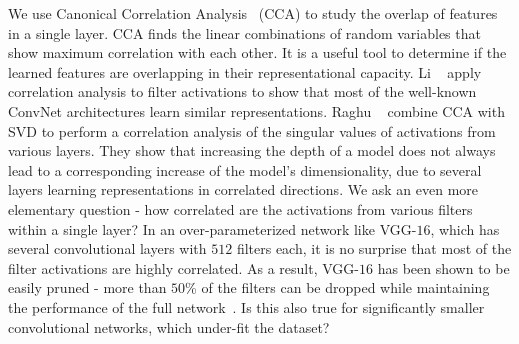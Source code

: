 We use Canonical Correlation Analysis~\cite{hotelling1936relations} (CCA) to study the overlap of features in a single layer.
CCA finds the linear combinations of random variables that show maximum correlation with each other.
It is a useful tool to determine if the learned features are overlapping in their representational capacity. 
Li \etal ~\cite{Li2015ConvergentLD} apply correlation analysis to filter activations to show that most of the well-known ConvNet architectures learn similar representations.
Raghu \etal ~\cite{Raghu2017SVCCASV} combine CCA with SVD to perform a correlation analysis of the singular values of activations from various layers.
They show that increasing the depth of a model does not always lead to a corresponding increase of the model's dimensionality, due to several layers learning representations in correlated directions.
We ask an even more elementary question - how correlated are the activations from various filters within a single layer?
In an over-parameterized network like VGG-$16$, which has several convolutional layers with $512$ filters each, it is no surprise that most of the filter activations are highly correlated.
As a result, VGG-$16$ has been shown to be easily pruned - more than $50$\% of the filters can be dropped while maintaining the performance of the full network~\cite{Molchanov2016PruningCN, Li2015ConvergentLD}.
Is this also true for significantly smaller convolutional networks, which under-fit the dataset?


